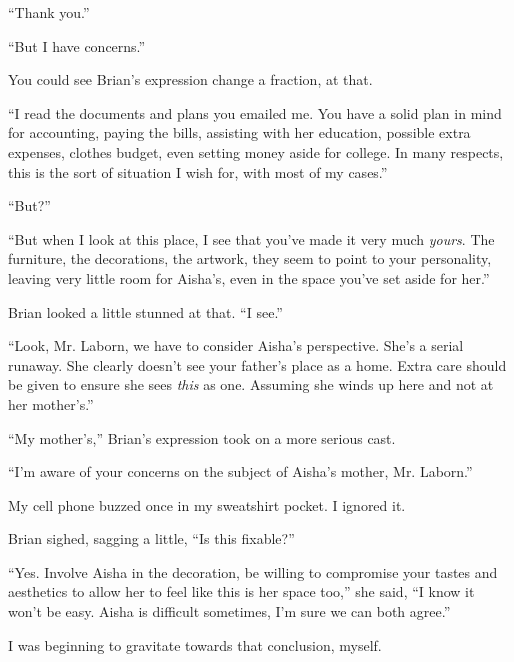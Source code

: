 ``Thank you.''



``But I have concerns.''



You could see Brian's expression change a fraction, at that.



``I read the documents and plans you emailed me.  You have a solid plan in mind for accounting, paying the bills, assisting with her education, possible extra expenses, clothes budget, even setting money aside for college.  In many respects, this is the sort of situation I wish for, with most of my cases.''



``But?''



``But when I look at this place, I see that you've made it very much \emph{yours}.  The furniture, the decorations, the artwork, they seem to point to your personality, leaving very little room for Aisha's, even in the space you've set aside for her.''



Brian looked a little stunned at that.  ``I see.''



``Look, Mr. Laborn, we have to consider Aisha's perspective.  She's a serial runaway.  She clearly doesn't see your father's place as a home.  Extra care should be given to ensure she sees \emph{this} as one.  Assuming she winds up here and not at her mother's.''



``My mother's,'' Brian's expression took on a more serious cast.



``I'm aware of your concerns on the subject of Aisha's mother, Mr. Laborn.''



My cell phone buzzed once in my sweatshirt pocket.  I ignored it.



Brian sighed, sagging a little, ``Is this fixable?''



``Yes.  Involve Aisha in the decoration, be willing to compromise your tastes and aesthetics to allow her to feel like this is her space too,'' she said, ``I know it won't be easy.  Aisha is difficult sometimes, I'm sure we can both agree.''



I was beginning to gravitate towards that conclusion, myself.



